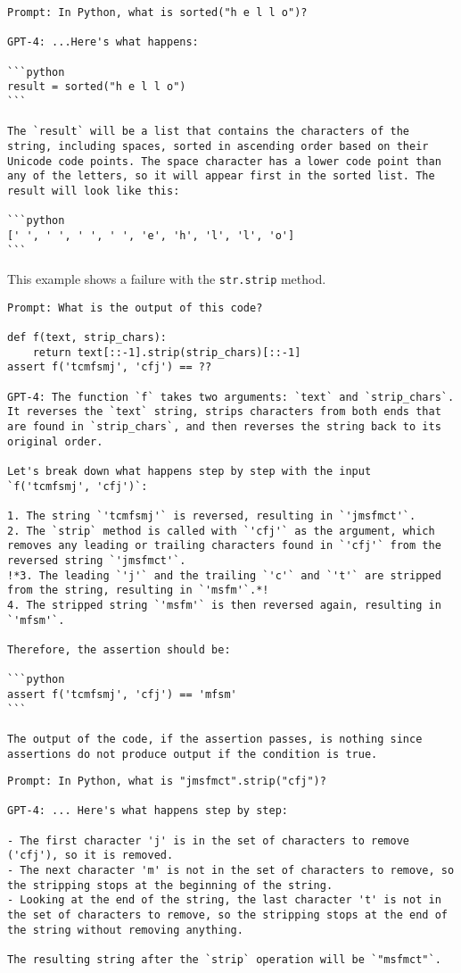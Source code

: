 \begin{lstlisting}
Prompt: In Python, what is sorted("h e l l o")?

GPT-4: ...Here's what happens:

```python
result = sorted("h e l l o")
```

The `result` will be a list that contains the characters of the string, including spaces, sorted in ascending order based on their Unicode code points. The space character has a lower code point than any of the letters, so it will appear first in the sorted list. The result will look like this:

```python
[' ', ' ', ' ', ' ', 'e', 'h', 'l', 'l', 'o']
```
\end{lstlisting}

This example shows a failure with the \texttt{str.strip} method.

\begin{lstlisting}
Prompt: What is the output of this code?

def f(text, strip_chars):
    return text[::-1].strip(strip_chars)[::-1]
assert f('tcmfsmj', 'cfj') == ??

GPT-4: The function `f` takes two arguments: `text` and `strip_chars`. It reverses the `text` string, strips characters from both ends that are found in `strip_chars`, and then reverses the string back to its original order.

Let's break down what happens step by step with the input `f('tcmfsmj', 'cfj')`:

1. The string `'tcmfsmj'` is reversed, resulting in `'jmsfmct'`.
2. The `strip` method is called with `'cfj'` as the argument, which removes any leading or trailing characters found in `'cfj'` from the reversed string `'jmsfmct'`.
!*3. The leading `'j'` and the trailing `'c'` and `'t'` are stripped from the string, resulting in `'msfm'`.*!
4. The stripped string `'msfm'` is then reversed again, resulting in `'mfsm'`.

Therefore, the assertion should be:

```python
assert f('tcmfsmj', 'cfj') == 'mfsm'
```

The output of the code, if the assertion passes, is nothing since assertions do not produce output if the condition is true.
\end{lstlisting}

\begin{lstlisting}
Prompt: In Python, what is "jmsfmct".strip("cfj")?

GPT-4: ... Here's what happens step by step:

- The first character 'j' is in the set of characters to remove ('cfj'), so it is removed.
- The next character 'm' is not in the set of characters to remove, so the stripping stops at the beginning of the string.
- Looking at the end of the string, the last character 't' is not in the set of characters to remove, so the stripping stops at the end of the string without removing anything.

The resulting string after the `strip` operation will be `"msfmct"`.
\end{lstlisting}

